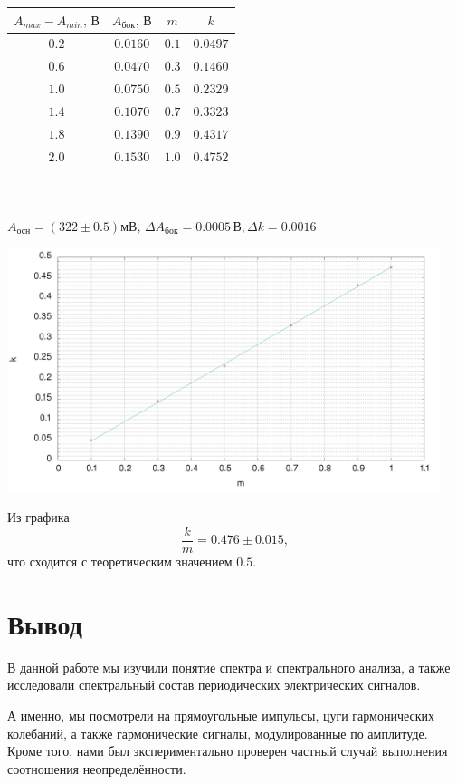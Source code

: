 \documentclass[a4paper,12pt]{article}
\begin{document}
\begin{center}
\begin{tabular}{|c|c|c|c|}\hline
$A_{max}-A_{min}\text{, В}$&$A_\text{бок}\text{, В}$&$m$&$k$\\\hline
$0.2$&$0.0160$&$0.1$&$0.0497$\\\hline
$0.6$&$0.0470$&$0.3$&$0.1460$\\\hline
$1.0$&$0.0750$&$0.5$&$0.2329$\\\hline
$1.4$&$0.1070$&$0.7$&$0.3323$\\\hline
$1.8$&$0.1390$&$0.9$&$0.4317$\\\hline
$2.0$&$0.1530$&$1.0$&$0.4752$\\\hline
\end{tabular}\\~\\
$A_\text{осн} = (322\pm0.5)\text{мВ},\,\Delta A_\text{бок}=0.0005\,\text{В},\Delta k=0.0016\,\text{}$
\end{center}
\begin{center}
\includegraphics[width=0.95\textwidth]{plot2.png}
\end{center}
Из графика
$$\frac{k}{m} = 0.476\pm0.015,$$
что сходится с теоретическим значением $0.5$.
\section*{Вывод}
В данной работе мы изучили понятие спектра и спектрального анализа, а также исследовали спектральный состав периодических электрических сигналов.

А именно, мы посмотрели на прямоугольные импульсы, цуги гармонических колебаний, а также гармонические сигналы, модулированные по амплитуде. Кроме того, нами был экспериментально проверен частный случай выполнения соотношения неопределённости.
\end{document}
